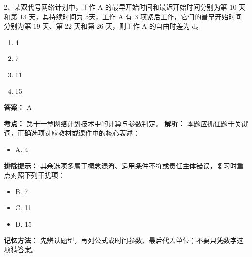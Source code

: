 \documentclass[UTF8,fontset=fandol,11pt]{ctexart}
\begin{document}
\vspace{0.2em}

\begin{quizbox}[title={第 8 题}]
2、某双代号网络计划中，工作 A 的最早开始时间和最迟开始时间分别为第 10 天和第 13 天，其持续时间为 5天，工作 A 有 3 项紧后工作，它们的最早开始时间分别为第 19 天、第 22 天和第 26 天，则工作 A 的自由时差为 d。\\
\begin{enumerate}[label=\Alph*.]
\item 4
\item 7
\item 11
\item 15
\end{enumerate}
\textbf{答案：} A
\vspace{0.25em}
\begin{answerbox}[title={考点解析}]
\textbf{考点：} 第十一章网络计划技术中的计算与参数判定。
\textbf{解析：} 本题应抓住题干关键词，正确选项对应教材或课件中的核心表述：
\begin{itemize}
\item A. 4
\end{itemize}
\textbf{排除提示：} 其余选项多属于概念混淆、适用条件不符或责任主体错误，复习时重点对照下列干扰项：
\begin{itemize}
\item B. 7
\item C. 11
\item D. 15
\end{itemize}
\textbf{记忆方法：} 先辨认题型，再列公式或时间参数，最后代入单位；不要只凭数字选项猜答案。
\end{answerbox}
\end{quizbox}

\vspace{0.2em}
\end{document}
